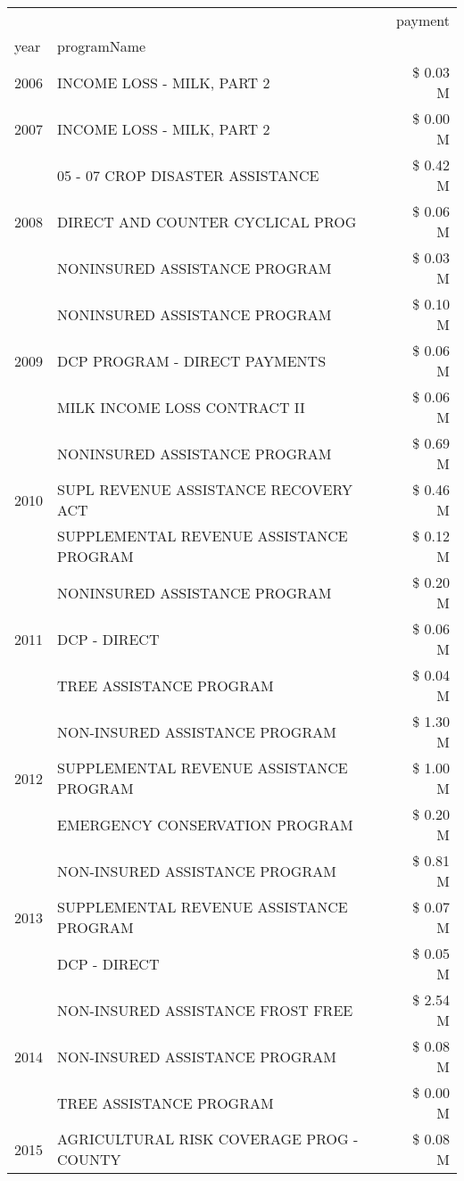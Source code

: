 \begin{tabular}{llr}
\toprule
 &  & payment \\
year & programName &  \\
\midrule
2006 & INCOME LOSS - MILK, PART 2 & \$ 0.03 M \\
\cline{1-3}
2007 & INCOME LOSS - MILK, PART 2 & \$ 0.00 M \\
\cline{1-3}
\multirow[t]{3}{*}{2008} & 05 - 07 CROP DISASTER ASSISTANCE & \$ 0.42 M \\
 & DIRECT AND COUNTER CYCLICAL PROG & \$ 0.06 M \\
 & NONINSURED ASSISTANCE PROGRAM & \$ 0.03 M \\
\cline{1-3}
\multirow[t]{3}{*}{2009} & NONINSURED ASSISTANCE PROGRAM & \$ 0.10 M \\
 & DCP PROGRAM - DIRECT PAYMENTS & \$ 0.06 M \\
 & MILK INCOME LOSS CONTRACT II & \$ 0.06 M \\
\cline{1-3}
\multirow[t]{3}{*}{2010} & NONINSURED ASSISTANCE PROGRAM & \$ 0.69 M \\
 & SUPL REVENUE ASSISTANCE RECOVERY ACT & \$ 0.46 M \\
 & SUPPLEMENTAL REVENUE ASSISTANCE PROGRAM & \$ 0.12 M \\
\cline{1-3}
\multirow[t]{3}{*}{2011} & NONINSURED ASSISTANCE PROGRAM & \$ 0.20 M \\
 & DCP - DIRECT & \$ 0.06 M \\
 & TREE ASSISTANCE PROGRAM & \$ 0.04 M \\
\cline{1-3}
\multirow[t]{3}{*}{2012} & NON-INSURED ASSISTANCE PROGRAM & \$ 1.30 M \\
 & SUPPLEMENTAL REVENUE ASSISTANCE PROGRAM & \$ 1.00 M \\
 & EMERGENCY CONSERVATION PROGRAM & \$ 0.20 M \\
\cline{1-3}
\multirow[t]{3}{*}{2013} & NON-INSURED ASSISTANCE PROGRAM & \$ 0.81 M \\
 & SUPPLEMENTAL REVENUE ASSISTANCE PROGRAM & \$ 0.07 M \\
 & DCP - DIRECT & \$ 0.05 M \\
\cline{1-3}
\multirow[t]{3}{*}{2014} & NON-INSURED ASSISTANCE FROST FREE & \$ 2.54 M \\
 & NON-INSURED ASSISTANCE PROGRAM & \$ 0.08 M \\
 & TREE ASSISTANCE PROGRAM & \$ 0.00 M \\
\cline{1-3}
\multirow[t]{3}{*}{2015} & AGRICULTURAL RISK COVERAGE PROG - COUNTY & \$ 0.08 M \\

\end{tabular}
